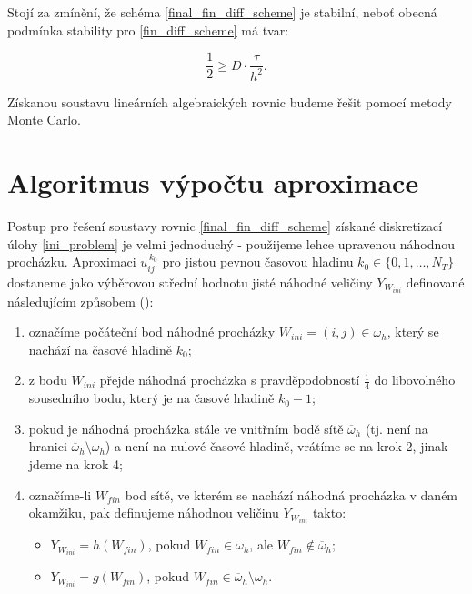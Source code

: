 \documentclass[11pt,american,czech]{article}
\newcommand*\midpoint[1]{\overline{#1}}
\begin{document}
Stojí za zmínění, že schéma \eqref{final_fin_diff_scheme} je stabilní, neboť obecná podmínka stability pro \eqref{fin_diff_scheme} má tvar: 

\begin{equation*}
	\frac{1}{2}\geq D\cdot\frac{\tau}{h^{2}}.
\end{equation*}

Získanou soustavu lineárních algebraických rovnic budeme řešit pomocí metody Monte Carlo.

\section{Algoritmus výpočtu aproximace}\label{sec:3}

Postup pro řešení soustavy rovnic \eqref{final_fin_diff_scheme} získané diskretizací úlohy \eqref{ini_problem} je velmi jednoduchý - použijeme lehce upravenou náhodnou procházku. Aproximaci $u^{\,k_{0}}_{ij}$ pro jistou pevnou časovou hladinu $k_{0}\in\{0,1,\dots,N_{T}\}$ dostaneme jako výběrovou střední hodnotu jisté náhodné veličiny $Y_{W_{ini}}$ definované následujícím způsobem (\cite{VIRIUS2010}):

\newpage{}

\begin{enumerate}
	\item označíme počáteční bod náhodné procházky $W_{ini}=(i,j)\in\omega_{h}$, který se nachází na časové hladině $k_{0}$;
	\item z bodu $W_{ini}$ přejde náhodná procházka s pravděpodobností $\frac{1}{4}$ do libovolného sousedního bodu, který je na časové hladině $k_{0}-1$;
	\item pokud je náhodná procházka stále ve vnitřním bodě sítě $\midpoint{\omega}_{h}$ (tj. není na hranici $\midpoint{\omega}_{h}\setminus\omega_{h}$) a není na nulové časové hladině, vrátíme se na krok 2, jinak jdeme na krok 4;
	\item označíme-li $W_{fin}$ bod sítě, ve kterém se nachází náhodná procházka v daném okamžiku, pak definujeme náhodnou veličinu $Y_{W_{ini}}$ takto:
	\begin{itemize}
		\item $Y_{W_{ini}}=h(W_{fin})$, pokud $W_{fin}\in\omega_{h}$, ale $W_{fin}\notin\midpoint{\omega}_{h}$;
		\item $Y_{W_{ini}}=g(W_{fin})$, pokud $W_{fin}\in\midpoint{\omega}_{h}\setminus\omega_{h}$.
	\end{itemize}
\end{enumerate}
\end{document}
